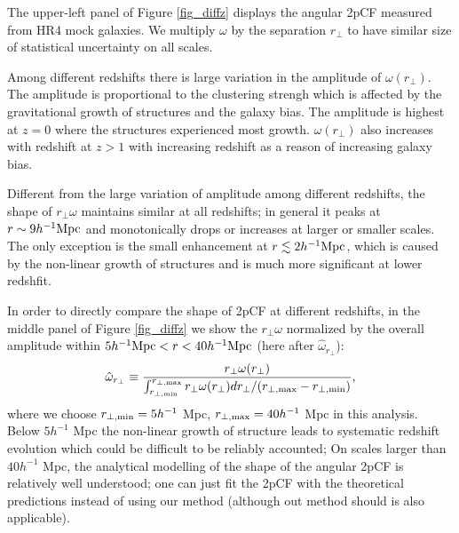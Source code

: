 \documentclass[iop]{emulateapj}
\begin{document}
The upper-left panel of Figure \ref{fig_diffz} displays the angular 2pCF measured from HR4 mock galaxies. %
We multiply $\omega$ by the separation $r_\perp$ to have similar size of statistical uncertainty on all scales.

Among different redshifts there is large variation in the amplitude of $\omega(r_\perp)$.
The amplitude is proportional to the clustering strengh which is affected by the gravitational growth of structures and the galaxy bias.
The amplitude is highest at $z=0$ where the structures experienced most growth.
$\omega(r_\perp)$ also increases with redshift at $z>1$ with increasing redshift 
as a reason of increasing galaxy bias.

Different from the large variation of amplitude among different redshifts, 
the shape of $r_\perp\omega$ maintains similar at all redshifts;
in general it peaks at $r\sim9 h^{-1}\rm Mpc$ and monotonically drops or increases at larger or smaller scales.
The only exception is the small enhancement at $r\lesssim 2 h^{-1}\rm Mpc$,
which is caused by the non-linear growth of structures 
and is much more significant at lower redshfit.

In order to directly compare the shape of 2pCF at different redshifts,
in the middle panel of Figure \ref{fig_diffz} 
we show the $r_\perp\omega$ normalized by the overall amplitude within 
$5h^{-1}{\rm Mpc} < r < 40h^{-1}{\rm Mpc}$
(here after $\hat \omega_{r_\perp}$):
\begin{equation}
 \hat \omega_{ r_\perp} \equiv  \frac{ {r_\perp\omega}(r_{\perp})}{ \int_{r_{\perp, \rm min}}^{r_{\perp, \rm max}}r_{\perp} \omega(r_{\perp}) d r_{\perp} / (r_{\perp,\rm max}-r_{\perp,\rm min}) },
\end{equation}
where we choose $r_{\perp, \rm min}=5 h^{-1}$ Mpc, $r_{\perp, \rm max}=40 h^{-1}$ Mpc in this analysis.
Below $5 h^{-1}$ Mpc the non-linear growth of structure 
leads to systematic redshift evolution which could be difficult to be reliably accounted;
On scales larger than $40 h^{-1}$ Mpc,
the analytical modelling of the shape of the angular 2pCF is relatively well understood;
one can just fit the 2pCF with the theoretical predictions \citep{Salvador2014,Salvador2016} 
instead of using our method 
(although out method should is also applicable).
\end{document}
